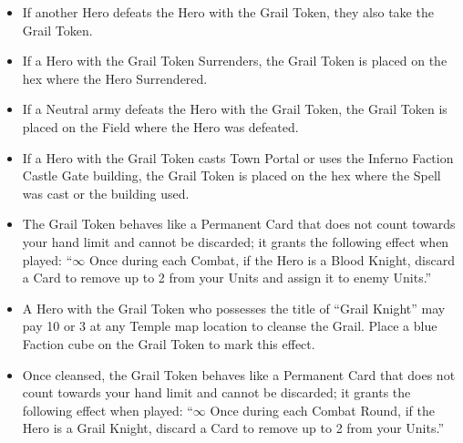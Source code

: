 \begin{multicols*}{2}
\begin{itemize}
  \item If another Hero defeats the Hero with the Grail Token, they also take the Grail Token.
  \item If a Hero with the Grail Token Surrenders, the Grail Token is placed on the hex where the Hero Surrendered.
  \item If a Neutral army defeats the Hero with the Grail Token, the Grail Token is placed on the Field where the Hero was defeated.
  \item If a Hero with the Grail Token casts Town Portal or uses the Inferno Faction Castle Gate building, the Grail Token is placed on the hex where the Spell was cast or the building used.
  \item The Grail Token behaves like a Permanent Card that does not count towards your hand limit and cannot be discarded; it grants the following effect when played: ``$\infty$ Once during each Combat, if the Hero is a \textcolor{darkcandyapplered}{Blood Knight}, discard a Card to remove up to 2  from your Units and assign it to enemy Units.''
  \item A Hero with the Grail Token who possesses the title of ``\textcolor{cobalt}{Grail Knight}'' may pay 10  or 3  at any Temple map location to cleanse the Grail. Place a blue Faction cube on the Grail Token to mark this effect.
  \item Once cleansed, the Grail Token behaves like a Permanent Card that does not count towards your hand limit and cannot be discarded; it grants the following effect when played: ``$\infty$ Once during each Combat Round, if the Hero is a \textcolor{cobalt}{Grail Knight}, discard a Card to remove up to 2  from your Units.''
\end{itemize}

\vspace*{\fill}

\begin{center}
\end{center}

\vspace*{\fill}

\end{multicols*}

